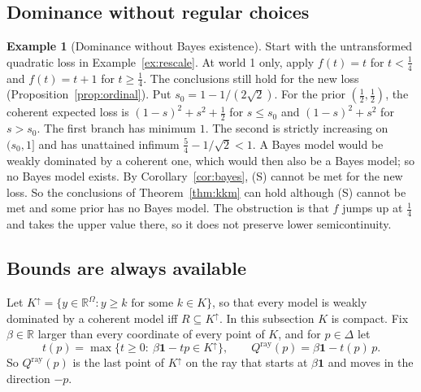 \documentclass[11pt]{article}
\theoremstyle{definition}
\newtheorem{example}[theorem]{Example}
\theoremstyle{remark}
\newcommand{\R}{\mathbb R}
\newcommand{\one}{\mathbf 1}
\begin{document}
\subsection{Dominance without regular choices}
\begin{example}[Dominance without Bayes existence]\label{ex:discontinuous}
Start with the untransformed quadratic loss in Example~\ref{ex:rescale}.  At world 1 only, apply $f(t)=t$ for $t<\tfrac14$ and $f(t)=t+1$ for $t\ge\tfrac14$. The conclusions still hold for the new loss (Proposition~\ref{prop:ordinal}). Put $s_0=1-1/(2\sqrt2)$. For the prior $(\tfrac12,\tfrac12)$, the coherent expected loss is $(1-s)^2+s^2+\tfrac12$ for $s\le s_0$ and $(1-s)^2+s^2$ for $s>s_0$. The first branch has minimum $1$. The second is strictly increasing on $(s_0,1]$ and has unattained infimum $\tfrac54-1/\sqrt2<1$. A Bayes model would be weakly dominated by a coherent one, which would then also be a Bayes model; so no Bayes model exists. By Corollary~\ref{cor:bayes}, (S) cannot be met for the new loss. So the conclusions of Theorem~\ref{thm:kkm} can hold although (S) cannot be met and some prior has no Bayes model. The obstruction is that $f$ jumps up at $\tfrac14$ and takes the upper value there, so it does not preserve lower semicontinuity.
\end{example}

\subsection{Bounds are always available}\label{sec:necessary}
Let $K^\uparrow=\{y\in\R^\Omega:y\ge k\text{ for some }k\in K\}$, so that every model is weakly dominated by a coherent model iff $R\subseteq K^\uparrow$. In this subsection $K$ is compact. Fix $\beta\in\R$ larger than every coordinate of every point of $K$, and for $p\in\Delta$ let
\[
 t(p)=\max\{t\ge0:\ \beta\one-tp\in K^\uparrow\},\qquad Q^{\mathrm{ray}}(p)=\beta\one-t(p)\,p.
\]
So $Q^{\mathrm{ray}}(p)$ is the last point of $K^\uparrow$ on the ray that starts at $\beta\one$ and moves in the direction $-p$.
\end{document}
